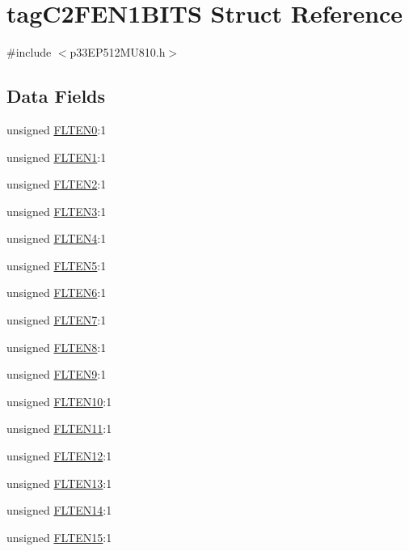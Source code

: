 \hypertarget{structtag_c2_f_e_n1_b_i_t_s}{}\section{tag\+C2\+F\+E\+N1\+B\+I\+TS Struct Reference}
\label{structtag_c2_f_e_n1_b_i_t_s}


{\ttfamily \#include $<$p33\+E\+P512\+M\+U810.\+h$>$}

\subsection*{Data Fields}
\begin{DoxyCompactItemize}
\item 
unsigned \hyperlink{structtag_c2_f_e_n1_b_i_t_s_aa79670b83376618bf0d6500c5165c765}{F\+L\+T\+E\+N0}\+:1
\item 
unsigned \hyperlink{structtag_c2_f_e_n1_b_i_t_s_aad6b481848368016ab582c7e1c562cb6}{F\+L\+T\+E\+N1}\+:1
\item 
unsigned \hyperlink{structtag_c2_f_e_n1_b_i_t_s_a0f944c21ae938d1bf82615a3a54a9bee}{F\+L\+T\+E\+N2}\+:1
\item 
unsigned \hyperlink{structtag_c2_f_e_n1_b_i_t_s_a1fdf3db50007b303ac5dcec8ae965b7d}{F\+L\+T\+E\+N3}\+:1
\item 
unsigned \hyperlink{structtag_c2_f_e_n1_b_i_t_s_af6599d3321c033afd86a72884b0c2b50}{F\+L\+T\+E\+N4}\+:1
\item 
unsigned \hyperlink{structtag_c2_f_e_n1_b_i_t_s_a43252a3bbc838478323d264c05817eea}{F\+L\+T\+E\+N5}\+:1
\item 
unsigned \hyperlink{structtag_c2_f_e_n1_b_i_t_s_ab353d0857baf0914716766e16b887832}{F\+L\+T\+E\+N6}\+:1
\item 
unsigned \hyperlink{structtag_c2_f_e_n1_b_i_t_s_acaf31ffb3c4c299569a520b25209e443}{F\+L\+T\+E\+N7}\+:1
\item 
unsigned \hyperlink{structtag_c2_f_e_n1_b_i_t_s_a3d4485461e50847e8dbe581c6a094df8}{F\+L\+T\+E\+N8}\+:1
\item 
unsigned \hyperlink{structtag_c2_f_e_n1_b_i_t_s_a55018b7d7f9966a022e6ce4585c68d78}{F\+L\+T\+E\+N9}\+:1
\item 
unsigned \hyperlink{structtag_c2_f_e_n1_b_i_t_s_a21aff454d256334c89e0a8d6a165a4c5}{F\+L\+T\+E\+N10}\+:1
\item 
unsigned \hyperlink{structtag_c2_f_e_n1_b_i_t_s_a561c8c98ec161d6da6009ea1ff0d6f39}{F\+L\+T\+E\+N11}\+:1
\item 
unsigned \hyperlink{structtag_c2_f_e_n1_b_i_t_s_a6c7fb5e256d7db18e204e798bd9ada82}{F\+L\+T\+E\+N12}\+:1
\item 
unsigned \hyperlink{structtag_c2_f_e_n1_b_i_t_s_ab336ddebd823774fbf1a68116b19f15c}{F\+L\+T\+E\+N13}\+:1
\item 
unsigned \hyperlink{structtag_c2_f_e_n1_b_i_t_s_ad4d67d7cc4af66d21709cd82a7767087}{F\+L\+T\+E\+N14}\+:1
\item 
unsigned \hyperlink{structtag_c2_f_e_n1_b_i_t_s_ababc9952ac7a911c84e0c6acf548b19a}{F\+L\+T\+E\+N15}\+:1
\end{DoxyCompactItemize}


